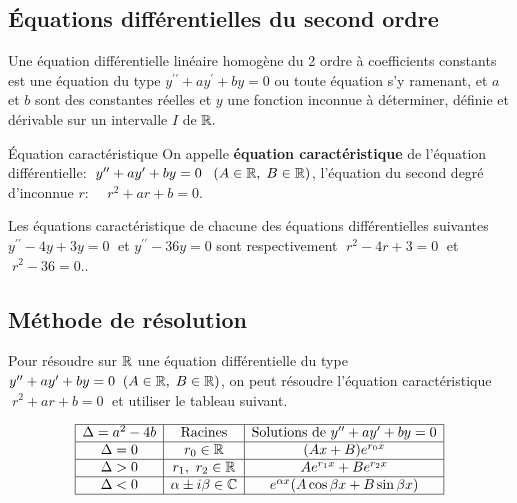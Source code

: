 \subsection{Équations différentielles du second ordre}
\begin{definition}
Une équation différentielle linéaire homogène du 2 ordre  à coefficients constants  est une équation du type  $y^{\prime \prime} +ay^{\prime}+by= 0$\; ou toute équation s'y ramenant, et $a $ et $ b$ sont des constantes réelles et $ y $ une fonction inconnue à déterminer, définie et dérivable sur un intervalle $ I$ de  $ \mathbb{R}.$
\end{definition}


 \begin{definition}{ Équation  caractéristique}
On appelle  \textbf{équation caractéristique} de l'équation différentielle: $\; y^{\prime \prime} +ay^{\prime}+by=0 \;\;\;(A\in\mathbb{R},\; B\in\mathbb{R})$, l'équation du second degré  d'inconnue $ r :\;\; $  $\; r^{2}+ar+b=0 $.
\end{definition}
\begin{example}
Les équations caractéristique de chacune des   équations différentielles suivantes \\$ y^{\prime \prime}-4y+3y=0 \;$ et \;$ y^{\prime \prime}-36y=0 $ sont respectivement  $\; r^{2} -4r+3=0\;$ et $\; r^{2}-36=0.$. 
\end{example}
\subsection*{Méthode de résolution}
Pour résoudre sur $ \mathbb{R} $  une équation différentielle du type $ y^{\prime \prime}+ ay^{\prime}+by=0\;\;(A\in\mathbb{R},\; B\in\mathbb{R})$, on peut  résoudre l'équation caractéristique \\ $\; r^{2}+ar+b=0 \;$  et utiliser le tableau suivant.




$$
\begin{array}{|c|c|c|}
\hline
\Delta = a^2 - 4b & \text{Racines} & \text{Solutions de } y'' + ay' + by = 0 \\
\hline
\Delta = 0 & r_0 \in \mathbb{R} & (Ax + B)e^{r_0 x} \\
\hline
\Delta > 0 & r_1,\ r_2 \in \mathbb{R} & Ae^{r_1 x} + Be^{r_2 x} \\
\hline
\Delta < 0 & \alpha \pm i\beta \in \mathbb{C} & e^{\alpha x}(A\cos\beta x + B\sin\beta x) \\
\hline
\end{array}
$$

